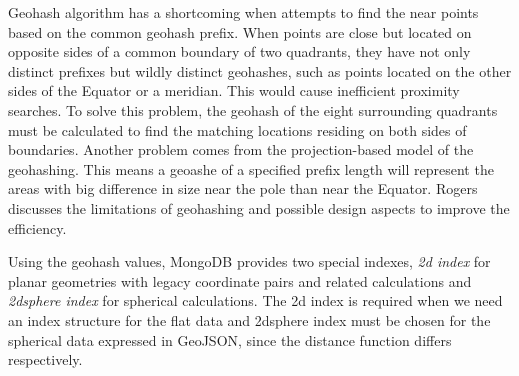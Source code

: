 \documentclass[a4paper,12pt]{article}
\begin{document}
Geohash algorithm has a shortcoming when attempts to find the near points based on the common geohash prefix. When points are close but located on opposite sides of a common boundary of two quadrants, they have not only distinct prefixes but wildly distinct geohashes, such as points located on the other sides of the Equator or a meridian. This would cause inefficient proximity searches. To solve this problem, the geohash of the eight surrounding quadrants must be calculated to find the matching locations residing on both sides of boundaries. 
Another problem comes from the projection-based model of the geohashing. This means a geoashe of a specified prefix length will represent the areas with big difference in size near the pole than near the Equator. 
Rogers~\cite{www/geohash-limit} discusses the limitations of geohashing and possible design aspects to improve the efficiency.




Using the geohash values, MongoDB provides two special indexes, \textit{2d index} for planar geometries with legacy coordinate pairs and related calculations and \textit{2dsphere index} for spherical calculations. The 2d index is required when we need an index structure for the flat data and 
2dsphere index must be chosen for the spherical data expressed in GeoJSON, since the distance function differs respectively.
\end{document}
